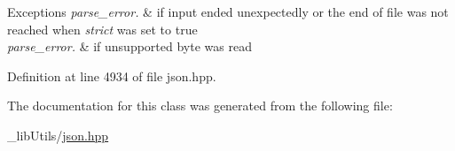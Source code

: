 \begin{DoxyExceptions}{Exceptions}
{\em parse\+\_\+error.} & if input ended unexpectedly or the end of file was not reached when {\itshape strict} was set to true \\
\hline
{\em parse\+\_\+error.} & if unsupported byte was read \\
\hline
\end{DoxyExceptions}


Definition at line 4934 of file json.\+hpp.



The documentation for this class was generated from the following file\+:\begin{DoxyCompactItemize}
\item 
\+\_\+lib\+Utils/\hyperlink{json_8hpp}{json.\+hpp}\end{DoxyCompactItemize}
